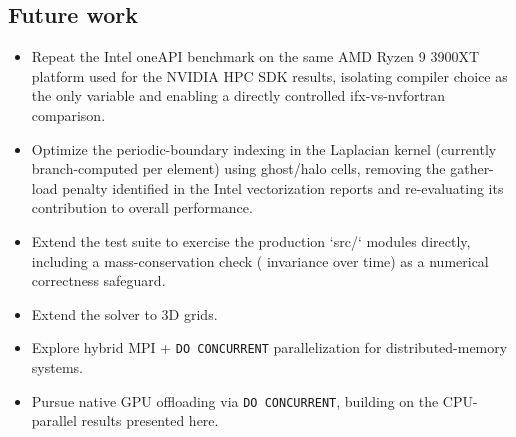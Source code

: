 \documentclass[11pt,a4paper]{article}
\begin{document}
	\subsection{Future work}
		\begin{itemize}
	\item Repeat the Intel oneAPI benchmark on the same AMD Ryzen 9 3900XT platform used for the NVIDIA HPC SDK results, isolating compiler choice as the only variable and enabling a directly controlled ifx-vs-nvfortran comparison.
	
	\item Optimize the periodic-boundary indexing in the Laplacian kernel (currently branch-computed per element) using ghost/halo cells, removing the gather-load penalty identified in the Intel vectorization reports and re-evaluating its contribution to overall performance.
	
	\item Extend the test suite to exercise the production `src/` modules directly, including a mass-conservation check ( invariance over time) as a numerical correctness safeguard.
	
	\item Extend the solver to 3D grids.
	
	\item Explore hybrid MPI + \texttt{DO CONCURRENT} parallelization for distributed-memory systems.
	
	\item Pursue native GPU offloading via \texttt{DO CONCURRENT}, building on the CPU-parallel results presented here.
	
	\end{itemize}
		
\end{document}

